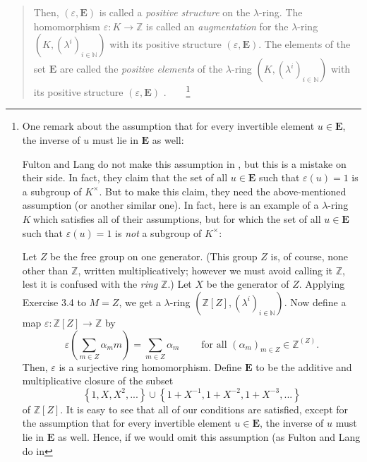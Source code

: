 \documentclass[numbers=enddot,12pt,final,onecolumn,notitlepage]{scrartcl}%
\begin{document}
\begin{quote}
Then, $\left(  \varepsilon,\mathbf{E}\right)  $ is called a \textit{positive
structure} on the $\lambda$-ring. The homomorphism $\varepsilon:K\rightarrow
\mathbb{Z}$ is called an \textit{augmentation} for the $\lambda$-ring $\left(
K,\left(  \lambda^{i}\right)  _{i\in\mathbb{N}}\right)  $ with its positive
structure $\left(  \varepsilon,\mathbf{E}\right)  $. The elements of the set
$\mathbf{E}$ are called the \textit{positive elements} of the $\lambda$-ring
$\left(  K,\left(  \lambda^{i}\right)  _{i\in\mathbb{N}}\right)  $ with its
positive structure $\left(  \varepsilon,\mathbf{E}\right)  $%
.\ \ \ \ \footnote{One remark about the assumption that for every invertible
element $u\in\mathbf{E}$, the inverse of $u$ must lie in $\mathbf{E}$ as well:
\par
Fulton and Lang do not make this assumption in \cite{FulLan85}, but this is a
mistake on their side. In fact, they claim that the set of all $u\in
\mathbf{E}$ such that $\varepsilon\left(  u\right)  =1$ is a subgroup of
$K^{\times}$. But to make this claim, they need the above-mentioned assumption
(or another similar one). In fact, here is an example of a $\lambda$-ring
$K\ $which satisfies all of their assumptions, but for which the set of all
$u\in\mathbf{E}$ such that $\varepsilon\left(  u\right)  =1$ is \textit{not} a
subgroup of $K^{\times}$:
\par
Let $Z$ be the free group on one generator. (This group $Z$ is, of course,
none other than $\mathbb{Z}$, written multiplicatively; however we must avoid
calling it $\mathbb{Z}$, lest it is confused with the \textit{ring}
$\mathbb{Z}$.) Let $X$ be the generator of $Z$. Applying Exercise 3.4 to
$M=Z$, we get a $\lambda$-ring $\left(  \mathbb{Z}\left[  Z\right]  ,\left(
\lambda^{i}\right)  _{i\in\mathbb{N}}\right)  $. Now define a map
$\varepsilon:\mathbb{Z}\left[  Z\right]  \rightarrow\mathbb{Z}$ by%
\[
\varepsilon\left(  \sum_{m\in Z}\alpha_{m}m\right)  =\sum_{m\in Z}\alpha
_{m}\ \ \ \ \ \ \ \ \ \ \text{for all }\left(  \alpha_{m}\right)  _{m\in Z}%
\in\mathbb{Z}^{\left(  Z\right)  }.
\]
Then, $\varepsilon$ is a surjective ring homomorphism. Define $\mathbf{E}$ to
be the additive and multiplicative closure of the subset%
\[
\left\{  1,X,X^{2},...\right\}  \cup\left\{  1+X^{-1},1+X^{-2},1+X^{-3}%
,...\right\}
\]
of $\mathbb{Z}\left[  Z\right]  $. It is easy to see that all of our
conditions are satisfied, except for the assumption that for every invertible
element $u\in\mathbf{E}$, the inverse of $u$ must lie in $\mathbf{E}$ as well.
Hence, if we would omit this assumption (as Fulton and Lang do in
}
\end{quote}
\end{document}
